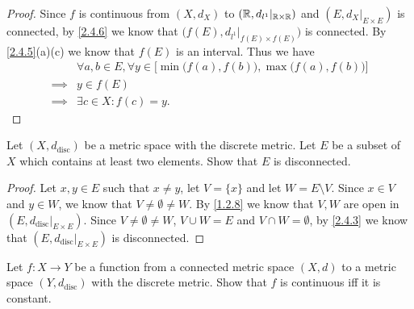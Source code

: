 \begin{proof}
  Since \(f\) is continuous from \((X, d_X)\) to \((\mathbb{R}, d_{l^1}|_{\mathbb{R} \times \mathbb{R}})\) and \((E, d_X|_{E \times E})\) is connected, by \cref{2.4.6} we know that \(\big(f(E), d_{l^1}|_{f(E) \times f(E)}\big)\) is connected.
  By \cref{2.4.5}(a)(c) we know that \(f(E)\) is an interval.
  Thus we have
  \begin{align*}
             & \forall a, b \in E, \forall y \in \Big[\min\big(f(a), f(b)\big), \max\big(f(a), f(b)\big)\Big] \\
    \implies & y \in f(E)                                                                                     \\
    \implies & \exists c \in X : f(c) = y.
  \end{align*}
\end{proof}

\exercisesection

\begin{ex}\label{ex:2.4.1}
  Let \((X, d_{\text{disc}})\) be a metric space with the discrete metric.
  Let \(E\) be a subset of \(X\) which contains at least two elements.
  Show that \(E\) is disconnected.
\end{ex}

\begin{proof}
  Let \(x, y \in E\) such that \(x \neq y\), let \(V = \{x\}\) and let \(W = E \setminus V\).
  Since \(x \in V\) and \(y \in W\), we know that \(V \neq \emptyset \neq W\).
  By \cref{1.2.8} we know that \(V, W\) are open in \((E, d_{\text{disc}}|_{E \times E})\).
  Since \(V \neq \emptyset \neq W\), \(V \cup W = E\) and \(V \cap W = \emptyset\), by \cref{2.4.3} we know that \((E, d_{\text{disc}}|_{E \times E})\) is disconnected.
\end{proof}

\begin{ex}\label{ex:2.4.2}
  Let \(f : X \to Y\) be a function from a connected metric space \((X, d)\) to a metric space \((Y, d_{\text{disc}})\) with the discrete metric.
  Show that \(f\) is continuous iff it is constant.
\end{ex}

